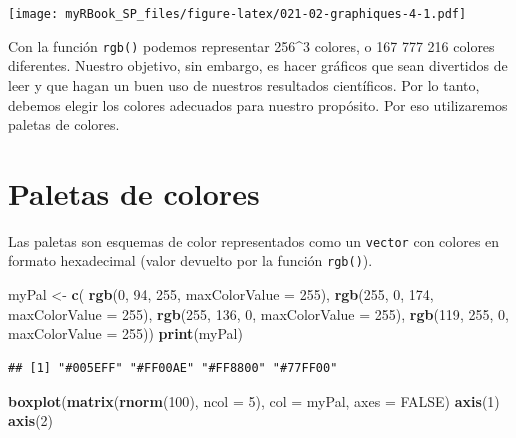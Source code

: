 \documentclass[
]{book}
\newenvironment{Shaded}{\begin{snugshade}}{\end{snugshade}}
\newcommand{\DataTypeTok}[1]{\textcolor[rgb]{0.13,0.29,0.53}{#1}}
\newcommand{\DecValTok}[1]{\textcolor[rgb]{0.00,0.00,0.81}{#1}}
\newcommand{\KeywordTok}[1]{\textcolor[rgb]{0.13,0.29,0.53}{\textbf{#1}}}
\newcommand{\NormalTok}[1]{#1}
\newcommand{\OtherTok}[1]{\textcolor[rgb]{0.56,0.35,0.01}{#1}}
\newcommand{\StringTok}[1]{\textcolor[rgb]{0.31,0.60,0.02}{#1}}
\begin{document}
\texttt{[image: myRBook\_SP\_files/figure-latex/021-02-graphiques-4-1.pdf]}

Con la función \texttt{rgb()} podemos representar 256\^{}3 colores, o 167 777 216 colores diferentes. Nuestro objetivo, sin embargo, es hacer gráficos que sean divertidos de leer y que hagan un buen uso de nuestros resultados científicos. Por lo tanto, debemos elegir los colores adecuados para nuestro propósito. Por eso utilizaremos paletas de colores.

\hypertarget{paletas-de-colores}{%
\section{Paletas de colores}\label{paletas-de-colores}}

Las paletas son esquemas de color representados como un \texttt{vector} con colores en formato hexadecimal (valor devuelto por la función \texttt{rgb()}).

\begin{Shaded}
\begin{Highlighting}[]
\NormalTok{myPal <-}\StringTok{ }\KeywordTok{c}\NormalTok{(}
  \KeywordTok{rgb}\NormalTok{(}\DecValTok{0}\NormalTok{, }\DecValTok{94}\NormalTok{, }\DecValTok{255}\NormalTok{, }\DataTypeTok{maxColorValue =} \DecValTok{255}\NormalTok{),  }
  \KeywordTok{rgb}\NormalTok{(}\DecValTok{255}\NormalTok{, }\DecValTok{0}\NormalTok{, }\DecValTok{174}\NormalTok{, }\DataTypeTok{maxColorValue =} \DecValTok{255}\NormalTok{),  }
  \KeywordTok{rgb}\NormalTok{(}\DecValTok{255}\NormalTok{, }\DecValTok{136}\NormalTok{, }\DecValTok{0}\NormalTok{, }\DataTypeTok{maxColorValue =} \DecValTok{255}\NormalTok{),  }
  \KeywordTok{rgb}\NormalTok{(}\DecValTok{119}\NormalTok{, }\DecValTok{255}\NormalTok{, }\DecValTok{0}\NormalTok{, }\DataTypeTok{maxColorValue =} \DecValTok{255}\NormalTok{))}
\KeywordTok{print}\NormalTok{(myPal)}
\end{Highlighting}
\end{Shaded}

\begin{verbatim}
## [1] "#005EFF" "#FF00AE" "#FF8800" "#77FF00"
\end{verbatim}

\begin{Shaded}
\begin{Highlighting}[]
\KeywordTok{boxplot}\NormalTok{(}\KeywordTok{matrix}\NormalTok{(}\KeywordTok{rnorm}\NormalTok{(}\DecValTok{100}\NormalTok{), }\DataTypeTok{ncol =} \DecValTok{5}\NormalTok{), }\DataTypeTok{col =}\NormalTok{ myPal, }\DataTypeTok{axes =} \OtherTok{FALSE}\NormalTok{)}
\KeywordTok{axis}\NormalTok{(}\DecValTok{1}\NormalTok{)}
\KeywordTok{axis}\NormalTok{(}\DecValTok{2}\NormalTok{)}
\end{Highlighting}
\end{Shaded}
\end{document}

